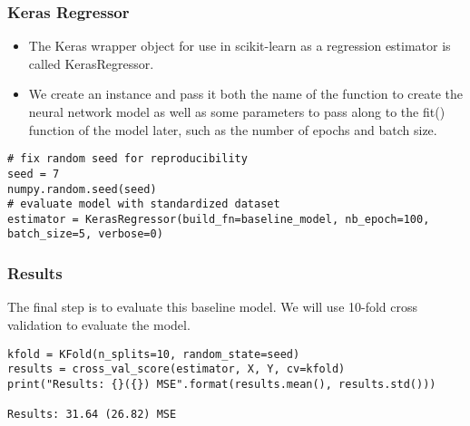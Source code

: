 \begin{frame}[fragile] \frametitle{Keras Regressor}
 \begin{itemize}
 \item The Keras wrapper object for use in scikit-learn as a regression estimator is called KerasRegressor. 
 \item We create an instance and pass it both the name of the function to create the neural network model as well as some parameters to pass along to the fit() function of the model later, such as the number of epochs and batch size.
 \end{itemize}
\begin{lstlisting}
# fix random seed for reproducibility
seed = 7
numpy.random.seed(seed)
# evaluate model with standardized dataset
estimator = KerasRegressor(build_fn=baseline_model, nb_epoch=100, batch_size=5, verbose=0)
\end{lstlisting}
\end{frame}

\begin{frame}[fragile] \frametitle{Results}
The final step is to evaluate this baseline model. We will use 10-fold cross validation to evaluate the model.
\begin{lstlisting}
kfold = KFold(n_splits=10, random_state=seed)
results = cross_val_score(estimator, X, Y, cv=kfold)
print("Results: {}({}) MSE".format(results.mean(), results.std()))

Results: 31.64 (26.82) MSE
\end{lstlisting}
\end{frame}



    


